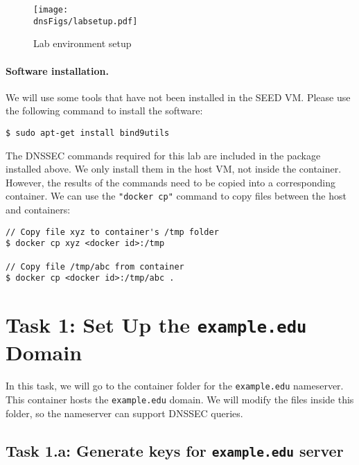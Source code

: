 \begin{figure}[htb]
\begin{center}
\texttt{[image: \\dnsFigs/labsetup.pdf]}
\end{center}
\caption{Lab environment setup}
\label{dnssec:fig:labsetup-simple}
\end{figure}



\paragraph{Software installation.} We will use some tools that 
have not been installed in the SEED VM. Please use the following
command to install the software: 

\begin{lstlisting}
$ sudo apt-get install bind9utils
\end{lstlisting}
 
The DNSSEC commands required for this lab are included in the package
installed above.  We only install them in the host VM, not inside the container. 
However, the results of the commands need to be copied into
a corresponding container. 
We can use the \texttt{"docker cp"}
command to copy files between the host and containers: 

\begin{lstlisting}
// Copy file xyz to container's /tmp folder
$ docker cp xyz <docker id>:/tmp

// Copy file /tmp/abc from container
$ docker cp <docker id>:/tmp/abc . 
\end{lstlisting}


\section{Task 1: Set Up the \texttt{example.edu} Domain}


In this task, we will go to the container folder for the 
\texttt{example.edu} nameserver. This container
hosts the \texttt{example.edu} domain. 
We will modify the files inside this folder, so the nameserver
can support DNSSEC queries. 



\subsection{Task 1.a: Generate keys for \texttt{example.edu} server} 

